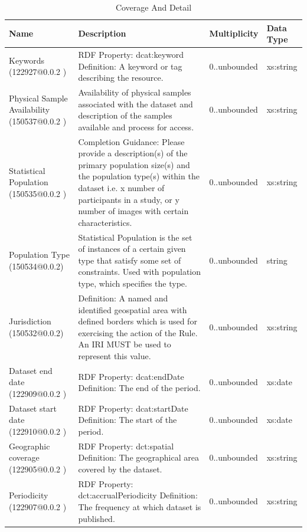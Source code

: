 \documentclass{article}
\begin{document}
\begin{table}[h]
	\begin{center}
		\caption{Coverage And Detail }
		\label{tab:coverage}
		\begin{tabular}{ p{3cm} | p{6cm} | p{2cm} | p{2cm}  } 
			\textbf{Name} &	\textbf{Description	}& \textbf{Multiplicity} &	\textbf{Data Type }\\
			\hline
			Keywords (122927@0.0.2 ) &	RDF Property:	dcat:keyword
			Definition:	A keyword or tag describing the resource.
			 &	0..unbounded &	xs:string
			\\
			\hline
			Physical Sample Availability (150537@0.0.2  ) &	Availability of physical samples associated with the dataset and description of the samples available and process for access.
			 &	0..unbounded &	xs:string
			\\
			\hline
			Statistical Population (150535@0.0.2  )	& Completion Guidance: Please provide a description(s) of the primary population size(s) and the population type(s) within the dataset i.e. x number of participants in a study, or y number of images with certain characteristics.
			 & 0..unbounded	& xs:string
			\\
			\hline
			Population Type (150534@0.0.2)  & Statistical Population is the set of instances of a certain given type that satisfy some set of constraints. Used with population type, which specifies the type.
			 &	0..unbounded &	string
			\\
			\hline
			Jurisdiction (150532@0.0.2)  &	Definition: A named and identified geospatial area with defined borders which is used for exercising the action of the Rule. An IRI MUST be used to represent this value.
		    &	0..unbounded &	xs:string
\\
			\hline
			Dataset end date (122909@0.0.2 ) &	RDF Property:	dcat:endDate
			Definition:	The end of the period.
			& 0..unbounded &	xs:date
\\
			\hline
			Dataset start date (122910@0.0.2 )	& RDF Property:	dcat:startDate
			Definition:	The start of the period.
			 & 0..unbounded &	xs:date
            \\
			\hline
			Geographic coverage (122905@0.0.2 )	 & RDF Property:	dct:spatial
			Definition:	The geographical area covered by the dataset.		
			&	0..unbounded &	xs:string
			\\
			\hline
			Periodicity (122907@0.0.2  ) &	RDF Property:	dct:accrualPeriodicity
			Definition:	The frequency at which dataset is published.
			& 0..unbounded &	xs:string
			\\
		\end{tabular}
	\end{center}
\end{table}
\FloatBarrier
\newpage
\end{document}
